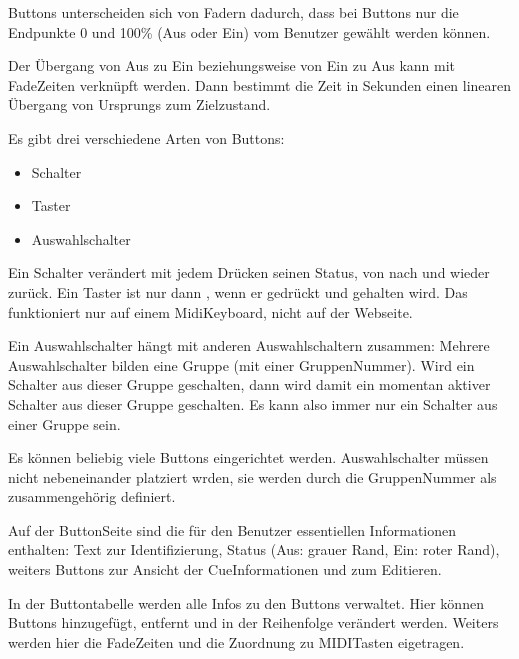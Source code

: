 \documentclass[letterpaper,10pt,ngerman]{sphinxmanual}
\begin{document}
Buttons unterscheiden sich von Fadern dadurch, dass bei
Buttons nur die Endpunkte 0 und 100\% (Aus oder Ein) vom Benutzer gewählt
werden können.

Der Übergang von Aus zu Ein beziehungsweise von Ein zu Aus kann mit
Fade\sphinxhyphen{}Zeiten verknüpft werden. Dann bestimmt die Zeit in Sekunden einen linearen
Übergang von Ursprungs\sphinxhyphen{} zum Zielzustand.

Es gibt drei verschiedene Arten von Buttons:
\begin{itemize}
\item {} 
Schalter

\item {} 
Taster

\item {} 
Auswahlschalter

\end{itemize}

Ein Schalter verändert mit jedem Drücken seinen Status, von  nach 
und wieder zurück.
Ein Taster ist nur dann , wenn er gedrückt und gehalten wird. Das
funktioniert nur auf einem Midi\sphinxhyphen{}Keyboard, nicht auf der Webseite.

Ein Auswahlschalter hängt mit anderen Auswahlschaltern zusammen: Mehrere
Auswahlschalter bilden eine Gruppe (mit einer Gruppen\sphinxhyphen{}Nummer). Wird ein
Schalter aus dieser Gruppe \sphinxhyphen{}geschalten, dann wird damit ein momentan
aktiver Schalter aus dieser Gruppe \sphinxhyphen{}geschalten. Es kann also immer
nur ein Schalter aus einer Gruppe  sein.

Es können beliebig viele Buttons eingerichtet werden. Auswahlschalter
müssen nicht nebeneinander platziert wrden, sie werden durch die Gruppen\sphinxhyphen{}Nummer
als zusammengehörig definiert.

Auf der Button\sphinxhyphen{}Seite sind die für den Benutzer essentiellen Informationen
enthalten: Text zur Identifizierung, Status (Aus: grauer Rand,
Ein: roter Rand), weiters Buttons zur Ansicht der Cue\sphinxhyphen{}Informationen und zum
Editieren.

In der Buttontabelle werden alle Infos zu den Buttons verwaltet. Hier können
Buttons hinzugefügt, entfernt und in der Reihenfolge verändert werden.
Weiters werden hier die Fade\sphinxhyphen{}Zeiten und die Zuordnung zu MIDI\sphinxhyphen{}Tasten
eigetragen.
\end{document}

